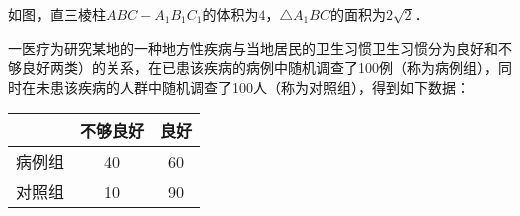 \documentclass[11pt,addpoints,answers]{exam}
\begin{document}
\begin{multicols}{3}
\begin{questions}
        \question[12]
        如图，直三棱柱$ABC-A_1B_1C_1$的体积为$4$，$\triangle A_1BC$的面积为$2\sqrt{2}$．
        \fillwithdottedlines{4in}

        \question[12]
        一医疗为研究某地的一种地方性疾病与当地居民的卫生习惯卫生习惯分为良好和不够良好两类）的关系，在已患该疾病的病例中随机调查了100例（称为病例组），同时在未患该疾病的人群中随机调查了100人（称为对照组），得到如下数据：
        \begin{center}
            \begin{tabular}{|c|c|c|}
                \hline
                       & 不够良好 & 良好 \\
                \hline
                病例组 & 40       & 60   \\
                \hline
                对照组 & 10       & 90   \\
                \hline
            \end{tabular}
        \end{center}
\end{questions}
\end{multicols}
\end{document}

